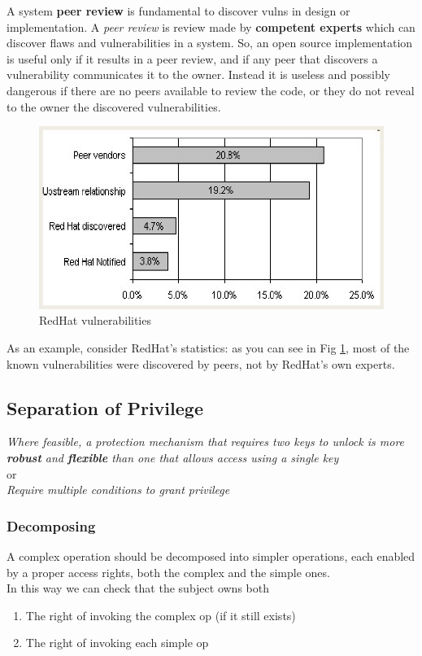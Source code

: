 A system \textbf{peer review} is fundamental to discover vulns in
design or implementation.
A \textit{peer review} is review made by \textbf{competent experts} which can discover flaws and vulnerabilities in a system.
So, an open source implementation is useful only if it results in a peer review, and if any peer that discovers a vulnerability communicates it
to the owner.
Instead it is useless and possibly dangerous if there are no peers available to review the code,
or they do not reveal to the owner the discovered vulnerabilities.

\begin{figure}[htbp]
   \centering
   \includegraphics[width=0.45\columnwidth]{images/opendesign_redhat.png}
   \caption{RedHat vulnerabilities}
   \label{fig:opendesign_redhat}
\end{figure}
As an example, consider RedHat's statistics:
as you can see in Fig \ref{fig:opendesign_redhat}, most of the known vulnerabilities were discovered by peers,
not by RedHat's own experts.

\subsection{Separation of Privilege}
\begin{center}
   \textit{Where feasible, a protection mechanism that requires
   two keys to unlock is more \textbf{robust} and \textbf{flexible} than one
   that allows access using a single key}\\
   or\\
   \textit{Require multiple conditions to grant privilege}
\end{center}

\subsubsection{Decomposing}
A complex operation should be decomposed into simpler
operations, 
each enabled by a proper access rights,
both the complex and the simple ones.\\
In this way we can check that the subject owns both
\begin{enumerate}
   \item The right of invoking the complex op (if it still exists)
   \item The right of invoking each simple op
\end{enumerate}

